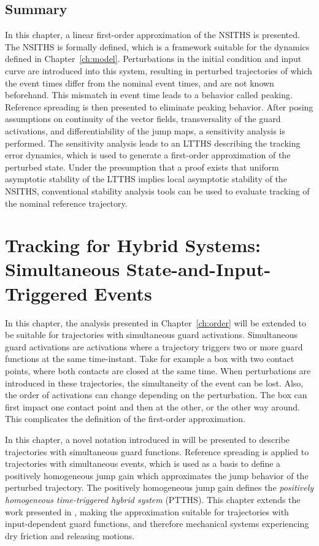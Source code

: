 \documentclass[../DC2017114Bouma.tex]{subfiles}
\begin{document}
\section{Summary}
In this chapter, a linear first-order approximation of the NSITHS is presented. The NSITHS is formally defined, which is a framework suitable for the dynamics defined in Chapter~\ref{ch:model}. Perturbations in the initial condition and input curve are introduced into this system, resulting in perturbed trajectories of which the event times differ from the nominal event times, and are not known beforehand. This mismatch in event time leads to a behavior called peaking. Reference spreading is then presented to eliminate peaking behavior. After posing assumptions on continuity of the vector fields, transversality of the guard activations, and differentiability of the jump maps, a sensitivity analysis is performed. The sensitivity analysis leads to an LTTHS describing the tracking error dynamics, which is used to generate a first-order approximation of the perturbed state. Under the presumption that a proof exists that uniform asymptotic stability of the LTTHS implies local asymptotic stability of the NSITHS, conventional stability analysis tools can be used to evaluate tracking of the nominal reference trajectory.


\cleartooddpage
\chapter{Tracking for Hybrid Systems: Simultaneous State-and-Input-Triggered Events}\label{ch:simult}
In this chapter, the analysis presented in Chapter~\ref{ch:order} will be extended to be suitable for trajectories with simultaneous guard activations. Simultaneous guard activations are activations where a trajectory triggers two or more guard functions at the same time-instant. Take for example a box with two contact points, where both contacts are closed at the same time. When perturbations are introduced in these trajectories, the simultaneity of the event can be lost. Also, the order of activations can change depending on the perturbation. The box can first impact one contact point and then at the other, or the other way around. This complicates the definition of the first-order approximation. 

In this chapter, a novel notation introduced in \cite{Rijnen2018} will be presented to describe trajectories with simultaneous guard functions. Reference spreading is applied to trajectories with simultaneous events, which is used as a basis to define a positively homogeneous jump gain which approximates the jump behavior of the perturbed trajectory. The positively homogeneous jump gain defines the \textit{positively homogeneous time-triggered hybrid system} (PTTHS). This chapter extends the work presented in \cite{Rijnen2018}, making the approximation suitable for trajectories with input-dependent guard functions, and therefore mechanical systems experiencing dry friction and releasing motions.
\end{document}
